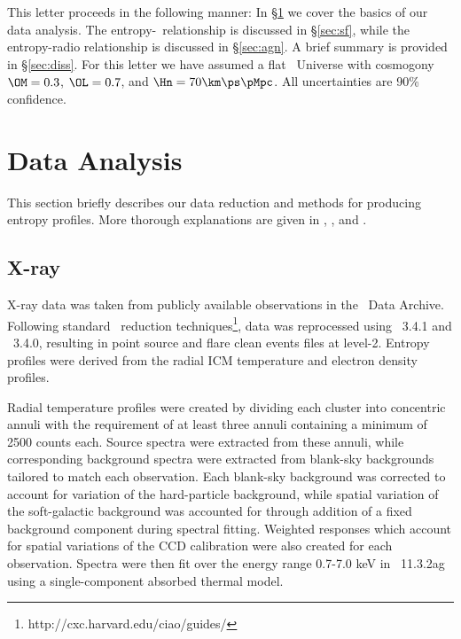 \documentclass{emulateapj}
\begin{document}
This letter proceeds in the following manner: In \S\ref{sec:data} we
cover the basics of our data analysis. The
entropy-\halpha\ relationship is discussed in \S\ref{sec:sf}, while
the entropy-radio relationship is discussed in \S\ref{sec:agn}. A
brief summary is provided in \S\ref{sec:diss}. For this letter we
have assumed a flat \LCDM\ Universe with cosmogony $\OM=0.3$,
$\OL=0.7$, and $\Hn=70\km\ps\pMpc$. All uncertainties are 90\%
confidence.

\section{Data Analysis}
\label{sec:data}

This section briefly describes our data reduction and methods for
producing entropy profiles. More thorough explanations are given in
\cite{d06}, \cite{accept}, and \cite{xrayband}.

\subsection{X-ray}
\label{sec:xray}

X-ray data was taken from publicly available observations in the
\Chandra\ Data Archive. Following standard \Ciao\ reduction
techniques\footnote{http://cxc.harvard.edu/ciao/guides/}, data was
reprocessed using \Ciao\ 3.4.1 and \Caldb\ 3.4.0, resulting in point
source and flare clean events files at level-2. Entropy profiles were
derived from the radial ICM temperature and electron density profiles.

Radial temperature profiles were created by dividing each cluster into
concentric annuli with the requirement of at least three annuli
containing a minimum of 2500 counts each. Source spectra were
extracted from these annuli, while corresponding background spectra
were extracted from blank-sky backgrounds tailored to match each
observation. Each blank-sky background was corrected to account for
variation of the hard-particle background, while spatial variation of
the soft-galactic background was accounted for through addition of a
fixed background component during spectral fitting. Weighted responses
which account for spatial variations of the CCD calibration were also
created for each observation. Spectra were then fit over the energy
range 0.7-7.0 keV in \xspec\ 11.3.2ag \citep{xspec} using a
single-component absorbed thermal model.
\end{document}
